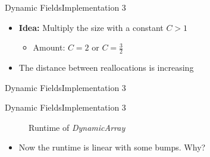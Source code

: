 
\begin{frame}{Dynamic Fields}{Implementation 3}
  \begin{itemize}
    \item
      \textbf{Idea:}
      Multiply the size with a constant $C > 1$
      \begin{itemize}
        \item
          Amount: $C = 2$ or $C = \frac{3}{2}$
      \end{itemize}
    \item
      The distance between reallocations is increasing
  \end{itemize}
\end{frame}


\begin{frame}{Dynamic Fields}{Implementation 3}
  
\end{frame}


\begin{frame}{Dynamic Fields}{Implementation 3}
  \begin{figure}
    \caption{Runtime of \textit{DynamicArray}}
    \label{fig:runtime_dynamic_array_impl3}
  \end{figure}
  \begin{itemize}
    \item
      Now the runtime is linear with some bumps. Why?
  \end{itemize}
\end{frame}


